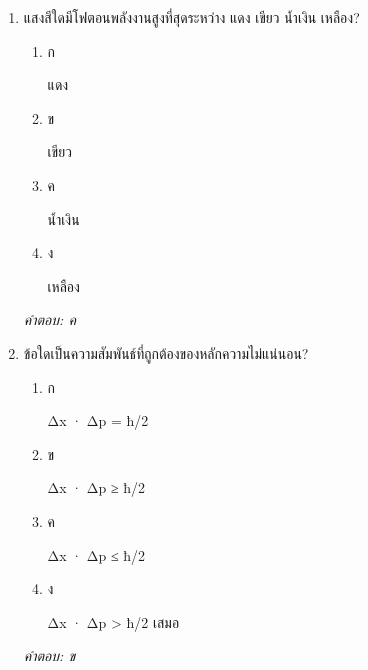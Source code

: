\documentclass[12pt]{article}
\begin{document}
\begin{enumerate}[label=\arabic*., itemsep=0.5\baselineskip, topsep=0.5\baselineskip, leftmargin=*]
\item แสงสีใดมีโฟตอนพลังงานสูงที่สุดระหว่าง แดง เขียว น้ำเงิน เหลือง?
\begin{enumerate}[label=\alph*)., itemsep=0.3\baselineskip, topsep=0.3\baselineskip]
\item ก\ 
\begin{minipage}[t]{0.9\linewidth}
\raggedright แดง
\end{minipage}
\item ข\ 
\begin{minipage}[t]{0.9\linewidth}
\raggedright เขียว
\end{minipage}
\item ค\ 
\begin{minipage}[t]{0.9\linewidth}
\raggedright น้ำเงิน
\end{minipage}
\item ง\ 
\begin{minipage}[t]{0.9\linewidth}
\raggedright เหลือง
\end{minipage}
\end{enumerate}
\vspace{-0.3\baselineskip}
\begin{small}
\textit{คำตอบ: ค}
\end{small}

\item ข้อใดเป็นความสัมพันธ์ที่ถูกต้องของหลักความไม่แน่นอน?
\begin{enumerate}[label=\alph*)., itemsep=0.3\baselineskip, topsep=0.3\baselineskip]
\item ก\ 
\begin{minipage}[t]{0.9\linewidth}
\raggedright Δx · Δp = ħ/2
\end{minipage}
\item ข\ 
\begin{minipage}[t]{0.9\linewidth}
\raggedright Δx · Δp ≥ ħ/2
\end{minipage}
\item ค\ 
\begin{minipage}[t]{0.9\linewidth}
\raggedright Δx · Δp ≤ ħ/2
\end{minipage}
\item ง\ 
\begin{minipage}[t]{0.9\linewidth}
\raggedright Δx · Δp > ħ/2 เสมอ
\end{minipage}
\end{enumerate}
\vspace{-0.3\baselineskip}
\begin{small}
\textit{คำตอบ: ข}
\end{small}


\end{enumerate}
\end{document}
